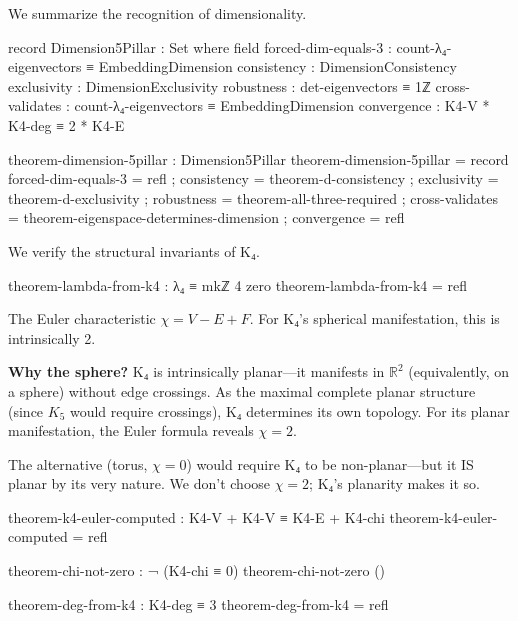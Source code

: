 \documentclass[11pt,a4paper]{book}
\begin{document}
We summarize the recognition of dimensionality.

\begin{code}
record Dimension5Pillar : Set where
  field
    forced-dim-equals-3 : count-λ₄-eigenvectors ≡ EmbeddingDimension
    consistency     : DimensionConsistency
    exclusivity     : DimensionExclusivity
    robustness      : det-eigenvectors ≡ 1ℤ
    cross-validates : count-λ₄-eigenvectors ≡ EmbeddingDimension
    convergence     : K4-V * K4-deg ≡ 2 * K4-E

theorem-dimension-5pillar : Dimension5Pillar
theorem-dimension-5pillar = record
  { forced-dim-equals-3 = refl
  ; consistency     = theorem-d-consistency
  ; exclusivity     = theorem-d-exclusivity
  ; robustness      = theorem-all-three-required
  ; cross-validates = theorem-eigenspace-determines-dimension
  ; convergence     = refl
  }

\end{code}

We verify the structural invariants of K₄.

\begin{code}
theorem-lambda-from-k4 : λ₄ ≡ mkℤ 4 zero
theorem-lambda-from-k4 = refl

\end{code}

The Euler characteristic $\chi = V - E + F$. For K₄'s spherical manifestation, this is intrinsically 2.

\textbf{Why the sphere?} K₄ is intrinsically planar—it manifests in $\mathbb{R}^2$ (equivalently, on a sphere) 
without edge crossings. As the maximal complete planar structure 
(since $K_5$ would require crossings), K₄ determines its own topology. For its planar manifestation, the Euler formula reveals $\chi = 2$.

The alternative (torus, $\chi = 0$) would require K₄ to be non-planar—but it IS planar by its very nature. 
We don't choose $\chi = 2$; K₄'s planarity makes it so.

\begin{code}
theorem-k4-euler-computed : K4-V + K4-V ≡ K4-E + K4-chi
theorem-k4-euler-computed = refl

theorem-chi-not-zero : ¬ (K4-chi ≡ 0)
theorem-chi-not-zero ()

\end{code}

\begin{code}
theorem-deg-from-k4 : K4-deg ≡ 3
theorem-deg-from-k4 = refl

\end{code}
\end{document}
